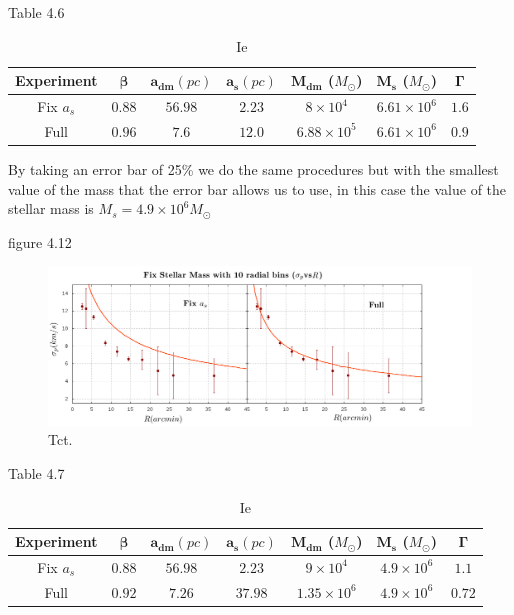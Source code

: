 Table 4.6

\begin{table}[H]
\begin{center}
\begin{tabular}{| c| c| c| c| c| c| c|}
    \hline
    \textbf{Experiment} & $\mathbf{\beta}$ & $\mathbf{a_{dm}} (pc)$ & $\mathbf{a_{s}} (pc)$ & $\mathbf{M_{dm}}$ ($M_{\odot}$) & $\mathbf{M_{s}}$ ($M_{\odot}$) & $\mathbf{\Gamma}$\\ \hline
	Fix $a_s$ &	$0.88$ &	$56.98$ &	$2.23$ &	$8 \times 10^{4}$ &	$6.61 \times 10 ^{6}$ &	$1.6$\\ \hline
	Full &	$0.96$ &	$7.6$ &	$12.0$ &	$6.88 \times 10^{5}$ &	$6.61 \times 10^{6}$ &	$0.9$\\ \hline
  \end{tabular} 
\caption[It]{Ie}
\end{center}
  
\end{table}

By taking an error bar of 25\% we do the same procedures but with the smallest value of the mass that the error bar allows us to use, in this case the value of the stellar mass is $M_{s}=4.9 \times 10^{6} M_{\odot}$

figure 4.12

\begin{figure}[H]
\centering
\includegraphics[width=15cm]{images/Starlight_25_10.png}
\caption[En]{Tct.}
\end{figure}

Table 4.7

\begin{table}[H]
\begin{center}
\begin{tabular}{| c| c| c| c| c| c| c|}
    \hline
    \textbf{Experiment} & $\mathbf{\beta}$ & $\mathbf{a_{dm}} (pc)$ & $\mathbf{a_{s}} (pc)$ & $\mathbf{M_{dm}}$ ($M_{\odot}$) & $\mathbf{M_{s}}$ ($M_{\odot}$) & $\mathbf{\Gamma}$\\ \hline
	Fix $a_s$ &	$0.88$ &	$56.98$ &	$2.23$ &	$9 \times 10^{4}$ &	$4.9 \times 10 ^{6}$ &	$1.1$\\ \hline
	Full &	$0.92$ &	$7.26$ &	$37.98$ &	$1.35 \times 10^{6}$ &	$4.9 \times 10^{6}$ &	$0.72$\\ \hline
  \end{tabular} 
\caption[It]{Ie}
\end{center}
  
\end{table}

